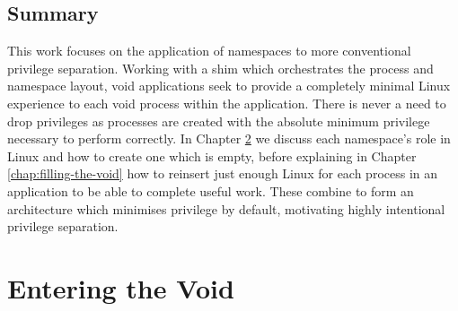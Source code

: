 \documentclass[12pt,a4paper,twoside]{report}
\begin{document}
\section{Summary}

This work focuses on the application of namespaces to more conventional privilege separation. Working with a shim which orchestrates the process and namespace layout, void applications seek to provide a completely minimal Linux experience to each void process within the application. There is never a need to drop privileges as processes are created with the absolute minimum privilege necessary to perform correctly. In Chapter \ref{chap:entering-the-void} we discuss each namespace's role in Linux and how to create one which is empty, before explaining in Chapter \ref{chap:filling-the-void} how to reinsert just enough Linux for each process in an application to be able to complete useful work. These combine to form an architecture which minimises privilege by default, motivating highly intentional privilege separation.


\chapter{Entering the Void}
\label{chap:entering-the-void}
\end{document}
